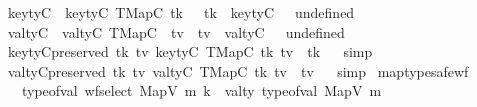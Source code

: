 \begin{isabellebody}
%
\isamarkuptrue%
%
\endisatagdocument
{\isafolddocument}%
%
\isadelimdocument
%
\endisadelimdocument
{}\isamarkupfalse%
\ key{\isacharunderscore}{\kern0pt}tyC\ \ {\isachardoublequoteopen}key{\isacharunderscore}{\kern0pt}tyC\ {\isacharparenleft}{\kern0pt}TMapC\ tk\ {\isacharunderscore}{\kern0pt}{\isacharparenright}{\kern0pt}\ {\isacharequal}{\kern0pt}\ tk{\isachardoublequoteclose}\ {\isacharbar}{\kern0pt}\ {\isachardoublequoteopen}key{\isacharunderscore}{\kern0pt}tyC\ {\isacharunderscore}{\kern0pt}\ {\isacharequal}{\kern0pt}\ undefined{\isachardoublequoteclose}\isanewline
{}\isamarkupfalse%
\ val{\isacharunderscore}{\kern0pt}tyC\ \ {\isachardoublequoteopen}val{\isacharunderscore}{\kern0pt}tyC\ {\isacharparenleft}{\kern0pt}TMapC\ {\isacharunderscore}{\kern0pt}\ tv{\isacharparenright}{\kern0pt}\ {\isacharequal}{\kern0pt}\ tv{\isachardoublequoteclose}\ {\isacharbar}{\kern0pt}\ {\isachardoublequoteopen}val{\isacharunderscore}{\kern0pt}tyC\ {\isacharunderscore}{\kern0pt}\ {\isacharequal}{\kern0pt}\ undefined{\isachardoublequoteclose}\isanewline
{}\isamarkupfalse%
\ key{\isacharunderscore}{\kern0pt}tyC{\isacharunderscore}{\kern0pt}preserved{\isacharcolon}{\kern0pt}\ {\isachardoublequoteopen}{\isasymforall}tk\ tv{\isachardot}{\kern0pt}\ key{\isacharunderscore}{\kern0pt}tyC\ {\isacharparenleft}{\kern0pt}TMapC\ tk\ tv{\isacharparenright}{\kern0pt}\ {\isacharequal}{\kern0pt}\ tk{\isachardoublequoteclose}%
\isadelimproof
\ %
\endisadelimproof
%
\isatagproof
{}\isamarkupfalse%
\ simp%
\endisatagproof
{\isafoldproof}%
%
\isadelimproof
%
\endisadelimproof
\isanewline
{}\isamarkupfalse%
\ val{\isacharunderscore}{\kern0pt}tyC{\isacharunderscore}{\kern0pt}preserved{\isacharcolon}{\kern0pt}\ {\isachardoublequoteopen}{\isasymforall}tk\ tv{\isachardot}{\kern0pt}\ val{\isacharunderscore}{\kern0pt}tyC\ {\isacharparenleft}{\kern0pt}TMapC\ tk\ tv{\isacharparenright}{\kern0pt}\ {\isacharequal}{\kern0pt}\ tv{\isachardoublequoteclose}%
\isadelimproof
\ %
\endisadelimproof
%
\isatagproof
{}\isamarkupfalse%
\ simp%
\endisatagproof
{\isafoldproof}%
%
\isadelimproof
%
\endisadelimproof
\isanewline
\isanewline
{}\isamarkupfalse%
\ map{\isacharunderscore}{\kern0pt}type{\isacharunderscore}{\kern0pt}safe{\isacharunderscore}{\kern0pt}wf{\isacharcolon}{\kern0pt}\isanewline
\ \ \ {\isachardoublequoteopen}type{\isacharunderscore}{\kern0pt}of{\isacharunderscore}{\kern0pt}val\ {\isacharparenleft}{\kern0pt}wf{\isacharunderscore}{\kern0pt}select\ {\isacharparenleft}{\kern0pt}MapV\ m{\isacharparenright}{\kern0pt}\ k{\isacharparenright}{\kern0pt}\ {\isacharequal}{\kern0pt}\ val{\isacharunderscore}{\kern0pt}ty\ {\isacharparenleft}{\kern0pt}type{\isacharunderscore}{\kern0pt}of{\isacharunderscore}{\kern0pt}val\ {\isacharparenleft}{\kern0pt}MapV\ m{\isacharparenright}{\kern0pt}{\isacharparenright}{\kern0pt}{\isachardoublequoteclose}\isanewline

\end{isabellebody}
